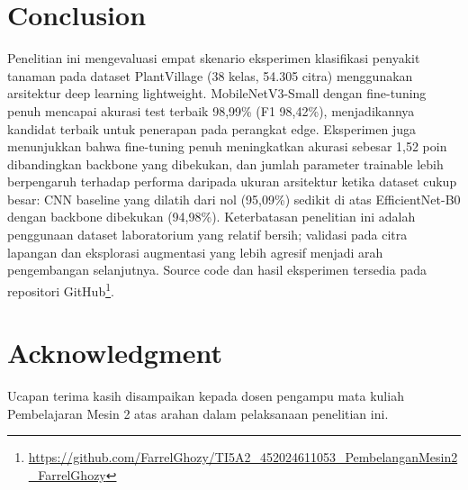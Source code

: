 \documentclass[conference,a4paper]{IEEEtran}
\begin{document}
\section{Conclusion}

Penelitian ini mengevaluasi empat skenario eksperimen klasifikasi penyakit tanaman pada dataset PlantVillage (38 kelas, 54.305 citra) menggunakan arsitektur deep learning lightweight. MobileNetV3-Small dengan fine-tuning penuh mencapai akurasi test terbaik 98,99\% (F1 98,42\%), menjadikannya kandidat terbaik untuk penerapan pada perangkat edge. Eksperimen juga menunjukkan bahwa fine-tuning penuh meningkatkan akurasi sebesar 1,52 poin dibandingkan backbone yang dibekukan, dan jumlah parameter trainable lebih berpengaruh terhadap performa daripada ukuran arsitektur ketika dataset cukup besar: CNN baseline yang dilatih dari nol (95,09\%) sedikit di atas EfficientNet-B0 dengan backbone dibekukan (94,98\%). Keterbatasan penelitian ini adalah penggunaan dataset laboratorium yang relatif bersih; validasi pada citra lapangan dan eksplorasi augmentasi yang lebih agresif menjadi arah pengembangan selanjutnya. Source code dan hasil eksperimen tersedia pada repositori GitHub\footnote{\url{https://github.com/FarrelGhozy/TI5A2_452024611053_PembelanganMesin2_FarrelGhozy}}.

\section*{Acknowledgment}
Ucapan terima kasih disampaikan kepada dosen pengampu mata kuliah Pembelajaran Mesin 2 atas arahan dalam pelaksanaan penelitian ini.
\end{document}
